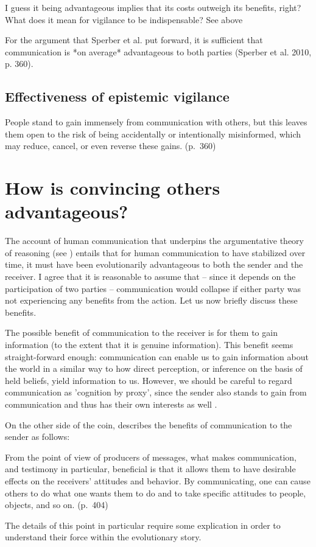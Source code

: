     I guess it being advantageous implies that its costs outweigh its benefits, right? What does it mean for vigilance to be indispensable? See above
    

For the argument that Sperber et al. put forward, it is sufficient that communication is *on average* advantageous to both parties (Sperber et al. 2010, p. 360).

\subsection{Effectiveness of epistemic vigilance}

\begin{quoting}
    People stand to gain immensely from communication with others, but this leaves them open to the risk of being accidentally or intentionally misinformed, which may reduce, cancel, or even reverse these gains.
\hfill (p.~360)
\end{quoting}

\section{How is convincing others advantageous?}

The account of human communication that underpins the argumentative theory of reasoning (see \citet{Sperber01, Sperber10})
entails that for human communication to have stabilized over time, it must have been evolutionarily advantageous to both the sender and the receiver. I agree that it is reasonable to assume that -- since it depends on the participation of two parties -- communication would collapse if either party was not experiencing any benefits from the action. Let us now briefly discuss these benefits.

The possible benefit of communication to the receiver is for them to gain information (to the extent that it is genuine information).
This benefit seems straight-forward enough: communication can enable us to gain information about the world in a similar way to how direct perception, or inference on the basis of held beliefs, yield information to us. However, we should be careful to regard communication as 'cognition by proxy', since the sender also stands to gain from communication and thus has their own interests as well \citep{Sperber01}.

On the other side of the coin, \citet{Sperber01} describes the benefits of communication to the sender as follows:
\begin{quoting}
    From the point of view of producers of messages, what makes communication, and testimony in particular, beneficial is that it allows them to have desirable effects on the receivers' attitudes and behavior. By communicating, one can cause others to do what one wants them to do and to take specific attitudes to people, objects, and so on.
    \hfill (p.~404)
\end{quoting}
The details of this point in particular require some explication in order to understand their force within the evolutionary story.

